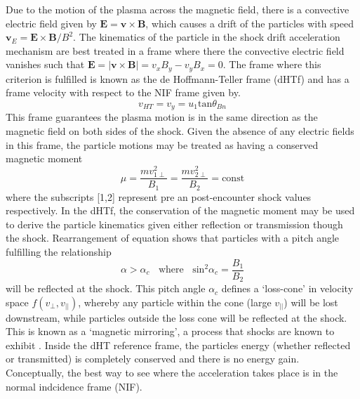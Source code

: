 Due to the motion of the plasma across the magnetic field, there is a convective electric field given by $\mathbf{E} = \mathbf{v}\times \mathbf{B}$, which causes a drift of the particles with speed $\mathbf{v}_E = \mathbf{E}\times \mathbf{B}/B^2$. The kinematics of the particle in the shock drift acceleration mechanism are best treated in a frame where there the convective electric field vanishes such that $\mathbf{E} = |\mathbf{v}\times \mathbf{B}|=v_x B_y - v_yB_x = 0$. The frame where this criterion is fulfilled is known as the de Hoffmann-Teller frame (dHTf) \citep{dehoffmann1950} and has a frame velocity with respect to the NIF frame given by. 
\begin{equation}
v_{HT} = v_y = u_1\mathrm{tan}\theta_{Bn}
\end{equation}
This frame guarantees the plasma motion is in the same direction as the magnetic field on both sides of the shock. Given the absence of any electric fields in this frame, the particle motions may be treated as having a conserved magnetic moment \citep{ball2001}
\begin{equation}
\mu = \frac{mv^2_{1\perp}}{B_1} = \frac{mv^2_{2\perp}}{B_2} = \mathrm{const}
\label{eqn:ad_in}
\end{equation}
where the subscripts [1,2] represent pre an post-encounter shock values respectively. In the dHTf, the conservation of the magnetic moment may be used to derive the particle kinematics given either reflection or transmission though the shock. Rearrangement of equation \label{eqn:ad_in} shows that particles with a pitch angle fulfilling the relationship
\begin{equation}
\alpha > \alpha_c~~~~\mathrm{where}~~~~\mathrm{sin}^2\alpha_c = \frac{B_1}{B_2}
\end{equation}
will be reflected at the shock. This pitch angle $\alpha_c$ defines a \textquoteleft loss-cone' in velocity space $f(v_{\perp}, v_{||})$, whereby any particle within the cone (large $v_{||}$) will be lost downstream, while particles outside the loss cone will be reflected at the shock. This is known as a \textquoteleft magnetic mirroring', a process that shocks are known to exhibit \citep{feldman1983}. Inside the dHT reference frame, the particles energy (whether reflected or transmitted) is completely conserved and there is no energy gain. Conceptually, the best way to see where the acceleration takes place is in the normal indcidence frame (NIF).

